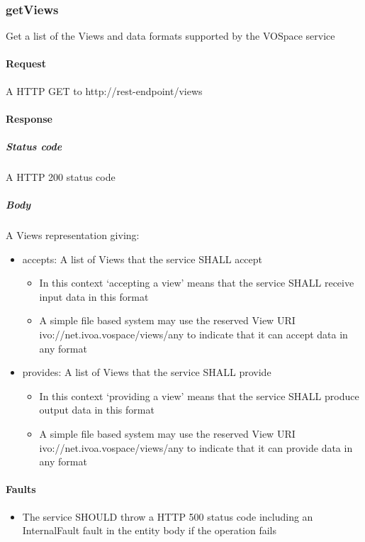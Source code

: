 \documentclass[11pt,a4paper]{ivoa}
\begin{document}
\subsubsection{getViews}
\label{subsubsec:getviews}
Get a list of the Views and data formats supported by the VOSpace service

\paragraph{Request}
A HTTP GET to http://rest-endpoint/views

\paragraph{Response}
\subparagraph{Status code} A HTTP 200 status code
\subparagraph{Body}
A Views representation giving:
\begin{itemize}
    \item accepts: A list of Views that the service SHALL accept
    \begin{itemize}
        \item In this context `accepting a view' means that the service SHALL receive input data in this format
        \item A simple file based system may use the reserved View URI ivo://net.ivoa.vospace/views/any to indicate that it can accept data in any format
    \end{itemize}
    \item provides: A list of Views that the service SHALL provide
    \begin{itemize}
        \item In this context `providing a view' means that the service SHALL produce output data in this format
        \item A simple file based system may use the reserved View URI ivo://net.ivoa.vospace/views/any to indicate that it can provide data in any format
    \end{itemize}
\end{itemize}

\paragraph{Faults}
\begin{itemize}
    \item The service SHOULD throw a HTTP 500 status code including an InternalFault fault in the entity body if the operation fails
\end{itemize}
\end{document}
